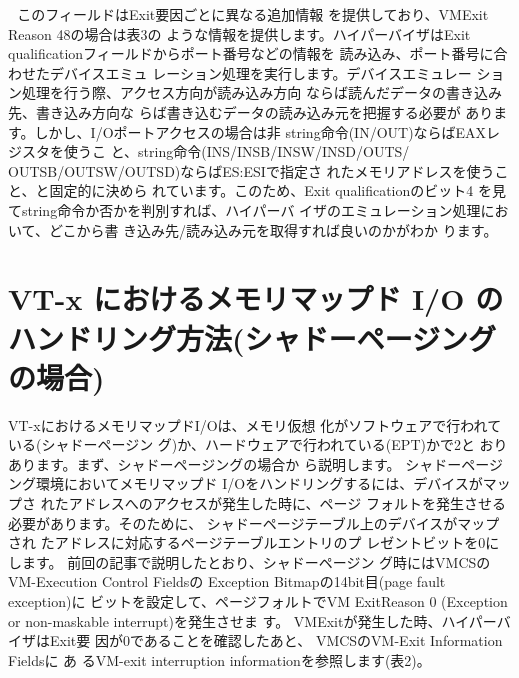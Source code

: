 \documentclass[a4j,12pt]{jarticle}
\begin{document}

 
 このフィールドはExit要因ごとに異なる追加情報
を提供しており、VMExit Reason 48の場合は表3の
ような情報を提供します。ハイパーバイザはExit
qualificationフィールドからポート番号などの情報を
読み込み、ポート番号に合わせたデバイスエミュ
レーション処理を実行します。デバイスエミュレー
ション処理を行う際、アクセス方向が読み込み方向
ならば読んだデータの書き込み先、書き込み方向な
らば書き込むデータの読み込み元を把握する必要が
あります。しかし、I/Oポートアクセスの場合は非
string命令(IN/OUT)ならばEAXレジスタを使うこ
と、string命令(INS/INSB/INSW/INSD/OUTS/
OUTSB/OUTSW/OUTSD)ならばES:ESIで指定さ
れたメモリアドレスを使うこと、と固定的に決めら
れています。このため、Exit qualificationのビット4
を見てstring命令か否かを判別すれば、ハイパーバ
イザのエミュレーション処理において、どこから書
き込み先/読み込み元を取得すれば良いのかがわか
ります。


\section{VT-x におけるメモリマップド I/O のハンドリング方法(シャドーページングの場合)}

 VT-xにおけるメモリマップドI/Oは、メモリ仮想
化がソフトウェアで行われている(シャドーページン
グ)か、ハードウェアで行われている(EPT)かで2と
おりあります。まず、シャドーページングの場合か
ら説明します。
 シャドーページング環境においてメモリマップド
I/Oをハンドリングするには、デバイスがマップさ
れたアドレスへのアクセスが発生した時に、ページ
フォルトを発生させる必要があります。そのために、
シャドーページテーブル上のデバイスがマップされ
たアドレスに対応するページテーブルエントリのプ
レゼントビットを0にします。
 前回の記事で説明したとおり、シャドーページン
グ時にはVMCSのVM-Execution Control Fieldsの
Exception Bitmapの14bit目(page fault exception)に
ビットを設定して、ページフォルトでVM ExitReason
0 (Exception or non-maskable interrupt)を発生させま
す。 VMExitが発生した時、ハイパーバイザはExit要
因が0であることを確認したあと、 VMCSのVM-Exit
Information Fieldsに あ るVM-exit interruption
informationを参照します(表2)。

\end{document}
